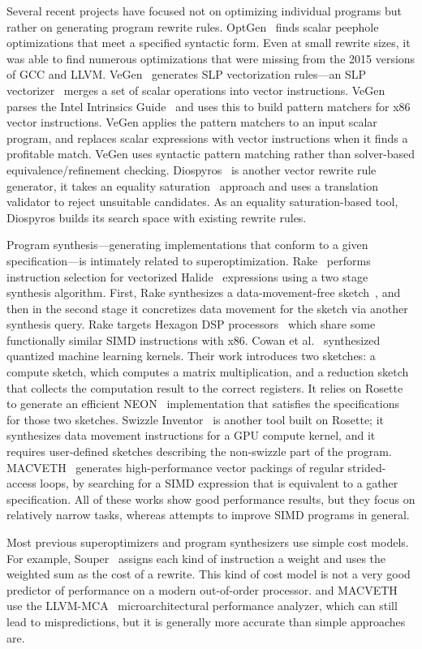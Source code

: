Several recent projects have focused not on optimizing individual
programs but rather on generating program rewrite rules.
%
OptGen~\cite{optgen} finds scalar peephole optimizations that meet
a specified syntactic form.
%
Even at small rewrite sizes, it was able to find numerous
optimizations that were missing from the 2015 versions of GCC and
LLVM\@.
%
VeGen~\cite{vegen} generates SLP vectorization rules---an SLP
vectorizer~\cite{slp} merges a set of scalar operations into vector
instructions.
%
VeGen parses the Intel Intrinsics Guide~\cite{intelguide} and uses this
to build pattern matchers for x86 vector instructions.
%
VeGen applies the pattern matchers to an input scalar program, and
replaces scalar expressions with vector instructions when it
finds a profitable match.
%
VeGen uses syntactic pattern matching rather than solver-based
equivalence/refinement checking.
%
Diospyros~\cite{diospyros} is another vector rewrite rule generator,
it takes an equality saturation~\cite{equalitysat} approach and uses a translation
validator to reject unsuitable candidates.
As an equality saturation-based tool, Diospyros builds its search space
with existing rewrite rules.


Program synthesis---generating implementations that conform to
a given specification---is intimately related to superoptimization.
%
Rake~\cite{rake} performs instruction selection for vectorized
Halide~\cite{halide} expressions using a two stage synthesis
algorithm.
%
First, Rake synthesizes a data-movement-free sketch~\cite{sketch}, and
then in the second stage it concretizes data movement for the
sketch via another synthesis query.
%
Rake targets Hexagon DSP processors~\cite{hexagon} which share some functionally
similar SIMD instructions with x86\@.
%
Cowan et al.~\cite{ml_syn} synthesized quantized machine learning
kernels.
%
Their work introduces two sketches: a compute sketch, which computes a matrix
multiplication, and a reduction sketch that collects the computation
result to the correct registers.
%
It relies on Rosette~\cite{rosette} to generate an efficient NEON~\cite{neon}
implementation that satisfies the specifications for those two
sketches.
%
Swizzle Inventor~\cite{swizzleinventor} is another tool built on
Rosette; it synthesizes data movement instructions for a GPU compute
kernel, and it requires user-defined sketches describing the
non-swizzle part of the program.
%
MACVETH~\cite{sparse} generates high-performance vector packings of
regular strided-access loops, by searching for a SIMD expression that
is equivalent to a gather specification.
%
All of these works show good performance results, but they focus on
relatively narrow tasks, whereas \minotaur{} attempts to improve SIMD
programs in general.


Most previous superoptimizers and program synthesizers use simple
cost models.
%
For example, Souper~\cite{souper} assigns each kind of instruction a
weight and uses the weighted sum as the cost of a rewrite.
%
This kind of cost model is not a very good predictor of performance
on a modern out-of-order processor.
%
\minotaur{} and MACVETH~\cite{sparse} use the LLVM-MCA~\cite{llvmmca}
microarchitectural performance analyzer, which can still lead to
mispredictions, but it is generally more accurate than simple
approaches are.
